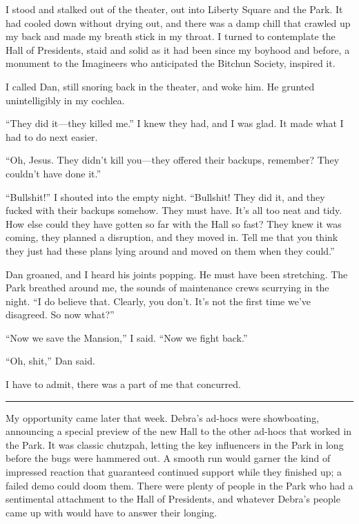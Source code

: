 I stood and stalked out of the theater, out into Liberty Square and
the Park. It had cooled down without drying out, and there was a
damp chill that crawled up my back and made my breath stick in my
throat. I turned to contemplate the Hall of Presidents, staid and
solid as it had been since my boyhood and before, a monument to the
Imagineers who anticipated the Bitchun Society, inspired it.

I called Dan, still snoring back in the theater, and woke him. He
grunted unintelligibly in my cochlea.

“They did it—they killed me.” I knew they had, and I was glad. It
made what I had to do next easier.

“Oh, Jesus. They didn't kill you—they offered their backups,
remember? They couldn't have done it.”

“Bullshit!” I shouted into the empty night. “Bullshit! They did it,
and they fucked with their backups somehow. They must have. It's
all too neat and tidy. How else could they have gotten so far with
the Hall so fast? They knew it was coming, they planned a
disruption, and they moved in. Tell me that you think they just had
these plans lying around and moved on them when they could.”

Dan groaned, and I heard his joints popping. He must have been
stretching. The Park breathed around me, the sounds of maintenance
crews scurrying in the night. “I do believe that. Clearly, you
don't. It's not the first time we've disagreed. So now what?”

“Now we save the Mansion,” I said. “Now we fight back.”

“Oh, shit,” Dan said.

I have to admit, there was a part of me that concurred.

\begin{center}\rule{3in}{0.4pt}\end{center}

My opportunity came later that week. Debra's ad-hocs were
showboating, announcing a special preview of the new Hall to the
other ad-hocs that worked in the Park. It was classic chutzpah,
letting the key influencers in the Park in long before the bugs
were hammered out. A smooth run would garner the kind of impressed
reaction that guaranteed continued support while they finished up;
a failed demo could doom them. There were plenty of people in the
Park who had a sentimental attachment to the Hall of Presidents,
and whatever Debra's people came up with would have to answer their
longing.

